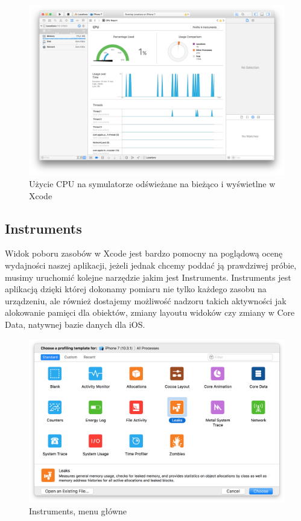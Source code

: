 \begin{figure}[ht!]
  \centering
  \includegraphics[width=120mm]{images/chapter-2-image-5-debugger.png}
  \caption{Użycie CPU na symulatorze odświeżane na bieżąco i wyświetlne w Xcode}
  \label{chapter-2-image-5-debugger}
\end{figure}

\subsection{Instruments}

Widok poboru zasobów w Xcode jest bardzo pomocny na poglądową ocenę wydajności naszej aplikacji, jeżeli jednak chcemy poddać ją
prawdziwej próbie, musimy uruchomić kolejne narzędzie jakim jest Instruments. Instruments jest aplikacją dzięki której dokonamy
pomiaru nie tylko każdego zasobu na urządzeniu, ale również dostajemy możliwość nadzoru takich aktywności jak alokowanie pamięci
dla obiektów, zmiany layoutu widoków czy zmiany w Core Data, natywnej bazie danych dla iOS.

\begin{figure}[ht!]
  \centering
  \includegraphics[width=120mm]{images/chapter-2-image-6-instruments.png}
  \caption{Instruments, menu główne}
  \label{chapter-2-image-6-instruments}
\end{figure}

